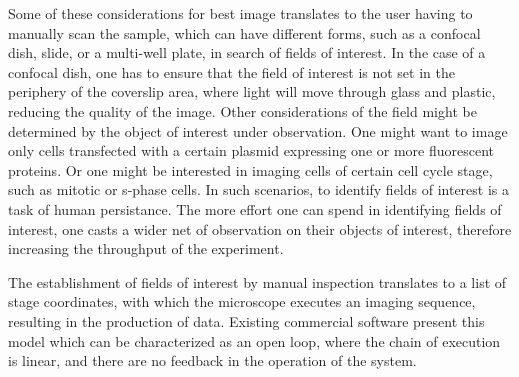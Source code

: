 Some of these considerations for best image translates to the user having to manually scan the sample, which can have different forms, such as a confocal dish, slide, or a multi-well plate, in search of fields of interest. In the case of a confocal dish, one has to ensure that the field of interest is not set in the periphery of the coverslip area, where light will move through glass and plastic, reducing the quality of the image. Other considerations of the field might be determined by the object of interest under observation. One might want to image only cells transfected with a certain plasmid expressing one or more fluorescent proteins. Or one might be interested in imaging cells of certain cell cycle stage, such as mitotic or s-phase cells. In such scenarios, to identify fields of interest is a task of human persistance. The more effort one can spend in identifying fields of interest, one casts a wider net of observation on their objects of interest, therefore increasing the throughput of the experiment.

The establishment of fields of interest by manual inspection translates to a list of stage coordinates, with which the microscope executes an imaging sequence, resulting in the production of data. Existing commercial software present this model which can be characterized as an open loop, where the chain of execution is linear, and there are no feedback in the operation of the system.

